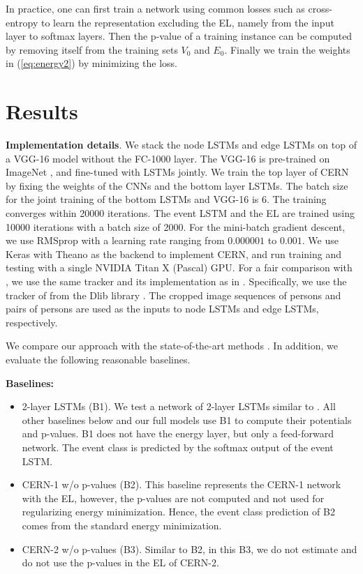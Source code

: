\documentclass[10pt,twocolumn,letterpaper]{article}
\begin{document}
In practice, one can first train a network using common losses such as cross-entropy to learn the representation excluding the EL, namely from the input layer to softmax layers. Then the p-value of a training instance can be computed by removing itself from the training sets $V_0$ and $E_0$. Finally we train the weights in (\ref{eq:energy2}) by minimizing the loss.






\section{Results}\label{sec:results}

{\bf Implementation details}. We stack the node LSTMs and edge LSTMs on top of a VGG-16 model \cite{Simonyan2014} without the FC-1000 layer. The VGG-16 is pre-trained on ImageNet \cite{Deng2009}, and fine-tuned with LSTMs jointly. We train the top layer of CERN by fixing the weights of the CNNs and the bottom layer LSTMs. The batch size for the joint training of the bottom LSTMs and VGG-16 is 6. The training converges within 20000 iterations. The event LSTM and the EL are trained using 10000 iterations with a batch size of 2000. For the mini-batch gradient descent, we use RMSprop \cite{Tieleman2012} with a learning rate ranging from $0.000001$ to $0.001$.  We use Keras \cite{chollet2015keras} with Theano \cite{Theano2016} as the backend to implement CERN, and run training and testing with a single NVIDIA Titan X (Pascal) GPU. For a fair comparison with \cite{Ibrahim2016}, we use the same tracker and its implementation as in \cite{Ibrahim2016}. Specifically, we use the tracker of \cite{Danelljan2014} from the Dlib library \cite{King2009}. The cropped image sequences of persons and pairs of persons are used as the inputs to node LSTMs and edge LSTMs, respectively.

We compare our approach with the state-of-the-art methods \cite{Hajimirsadeghi2015, Ibrahim2016}. In addition, we evaluate the following reasonable baselines.

{\bf Baselines:}
\begin{itemize}[itemsep=-5pt,topsep=2pt, partopsep=1pt]
\item 2-layer LSTMs (B1).  We test a network of 2-layer LSTMs similar to \cite{Ibrahim2016}. All other baselines below and our full models use B1 to compute their potentials and p-values. B1 does not have the energy layer, but only a feed-forward network. The event class is predicted by the softmax output of the event LSTM.
\item CERN-1 w/o p-values (B2). This baseline represents the CERN-1 network with the EL, however, the p-values are not computed and not used for regularizing energy minimization. Hence, the event class prediction of B2 comes from the standard energy minimization.
\item CERN-2 w/o p-values (B3). Similar to B2, in this B3, we do not estimate and do not use the p-values in the EL of CERN-2.
\end{itemize}
\end{document}
